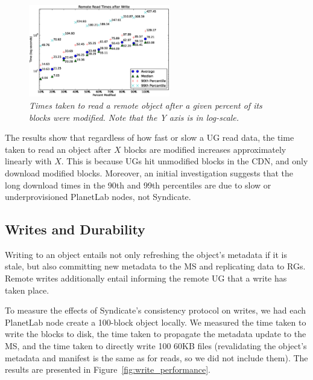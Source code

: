 \begin{figure}[h!]
\centerline{\includegraphics[width=0.55\textwidth]{figures/read_after_write}}
\label{fig:read_after_write}
\caption{\it Times taken to read a remote object after a given percent of its blocks were modified.  Note that the Y axis is in log-scale.}
\end{figure}

The results show that regardless of how fast or slow a UG read data, the time taken to read an object after $X$ blocks are modified increases approximately linearly with $X$.  This is because UGs hit unmodified blocks in the CDN, and only download modified blocks.  Moreover, an initial investigation suggests that the long download times in the 90th and 99th percentiles are due to slow or underprovisioned PlanetLab nodes, not Syndicate.

\subsection{Writes and Durability}


Writing to an object entails not only refreshing the object's metadata if it is stale, but also committing new metadata to the MS and replicating data to RGs.  Remote writes additionally entail informing the remote UG that a write has taken place.

To measure the effects of Syndicate's consistency protocol on writes, we had each PlanetLab node create a 100-block object locally.  We measured the time taken to write the blocks to disk, the time taken to propagate the metadata update to the MS, and the time taken to directly write 100 60KB files (revalidating the object's metadata and manifest is the same as for reads, so we did not include them).  The results are presented in Figure~\ref{fig:write_performance}.

